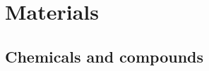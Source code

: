 
\chapter{Materials} %

\label{Materials} %



\section{Chemicals and compounds}

\begin{center}



\end{center}
